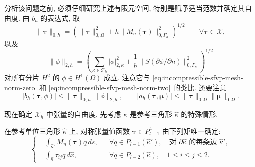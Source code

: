 分析该问题之前, 必须仔细研究上述有限元空间,
特别是赋予适当范数并确定其自由度.
由 $b_h$ 的表达式, 取
\begin{equation}\label{eq:incompressible-hhj-tensor-mesh-norm}
\|\boldsymbol\tau\|_{0,h}
=\left(
\|\boldsymbol\tau\|_{0,\Omega}^2
+h\|M_n(\boldsymbol\tau)\|_{0,\Gamma_h}^2
\right)^{1/2}
\qquad\forall\boldsymbol\tau\in\mathcal X,
\end{equation}
以及
\begin{equation}\label{eq:incompressible-hhj-stream-mesh-norm}
\|\phi\|_{2,h}
=\left(
\sum_{\kappa\in\mathcal T_h}|\phi|_{2,\kappa}^2
+\frac1h\|S(\partial\phi/\partial n)\|_{0,\Gamma_h}^2
\right)^{1/2}
\end{equation}
对所有分片 $H^2$ 的 $\phi\in H^1(\Omega)$ 成立.
注意它与
\eqref{eq:incompressible-sfvp-mesh-norm-zero}
和 \eqref{eq:incompressible-sfvp-mesh-norm-two} 的类比.
还要注意
\[
|b_h(\boldsymbol\tau,\phi)|
\leq\|\boldsymbol\tau\|_{0,h}\|\phi\|_{2,h},
\qquad
|a_h(\boldsymbol\tau,\boldsymbol\mu)|
\leq\|\boldsymbol\tau\|_{0,\Omega}
\|\boldsymbol\mu\|_{0,\Omega}.
\]

现在确定 $\mathcal X_h$ 中张量的自由度.
先考虑 $\kappa$ 是参考三角形 $\widehat\kappa$ 的特殊情形.

\begin{Lemma}\label{lem:incompressible-hhj-reference-dofs}
在参考单位三角形 $\widehat\kappa$ 上,
对称张量值函数 $\boldsymbol\tau\in P_{l-1}^4$
由下列矩唯一确定:
\begin{equation}\label{eq:incompressible-hhj-reference-dofs}
\left\{
\begin{aligned}
&\int_{\widehat\kappa'}M_n(\boldsymbol\tau)q\,ds,
&&\forall q\in P_{l-1}(\widehat\kappa'),
\quad\text{对 }\partial\widehat\kappa\text{ 的每条边 }\widehat\kappa',\\
&\int_{\widehat\kappa}\tau_{ij}q\,d\widehat x,
&&\forall q\in P_{l-2}(\widehat\kappa),
\quad1\leq i\leq j\leq2.
\end{aligned}
\right.
\end{equation}
\end{Lemma}


